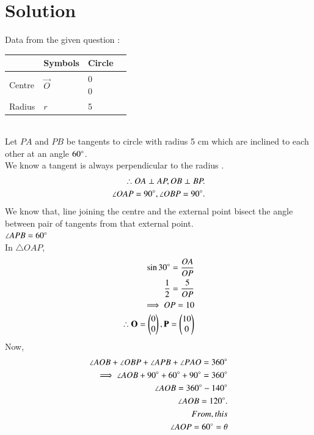 \documentclass[journal,12pt,twocolumn]{IEEEtran}
\begin{document}
\section{Solution}
Data from the given question :
\begin{table}[!ht]
\begin{center}
\begin{tabular}{ | m{2cm} | m{1.5cm}| m{2cm} | m{1.5cm} |} 
\hline
& Symbols & Circle \\
\hline
Centre & $\vec{O}$ & \myvec{0\\0} \\ 
\hline
Radius & $r$ & 5\\ 
\hline
\end{tabular}
\end{center}
\end{table}
\\
Let $PA$ and $PB$  be tangents  to circle with radius 5 cm  which are inclined to each other at an angle $60\degree$.
\\
We know a tangent is always perpendicular to the radius .
\begin{align}
\therefore OA \perp AP ,  OB \perp BP.
\\
\angle OAP=90\degree, \angle OBP=90\degree.
\end{align}
We know that, line joining the centre and the external point bisect the angle between pair of tangents from that external point.
\\
$\angle APB=60\degree$
\\
 In $\triangle OAP$, 
\begin{align}
\sin30\degree=\frac{OA}{OP}
\\
\frac{1}{2}=\frac{5}{OP}
\\
\implies OP=10
\\
\therefore \mathbf{O}=\begin{pmatrix}0\\0\end{pmatrix} , \mathbf{P}=\begin{pmatrix}10\\0\end{pmatrix}
\end{align}
Now, 
\begin{align}
\angle AOB + \angle OBP + \angle APB + \angle PAO=360\degree
\\
\implies \angle AOB +90\degree + 60\degree +90\degree =360\degree
\\
\angle AOB= 360\degree -140\degree
\\
\angle AOB =120\degree.
\\
From, this
\\
\angle AOP=60\degree=\theta
\end{align}
\end{document}
